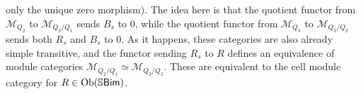 \begin{example}
only the unique zero morphism). The idea here is that the quotient functor from $\mathcal{M}_{Q_2}$ to $\mathcal{M}_{Q_2/Q_1}$ sends $B_s$ to $0$, while the quotient functor from $\mathcal{M}_{Q_3}$ to $\mathcal{M}_{Q_3/Q_2}$ sends both $R_s$ and $B_s$ to $0$. As it happens, these categories are also already simple transitive, and the functor sending $R_s$ to $R$ defines an equivalence of module categories $\mathcal{M}_{Q_2/Q_1} \simeq \mathcal{M}_{Q_3/Q_2}$. These are equivalent to the cell module category for $R \in \textnormal{Ob}(\mathbb{S}\textnormal{\textsf{Bim}})$.\\%

\end{example}

